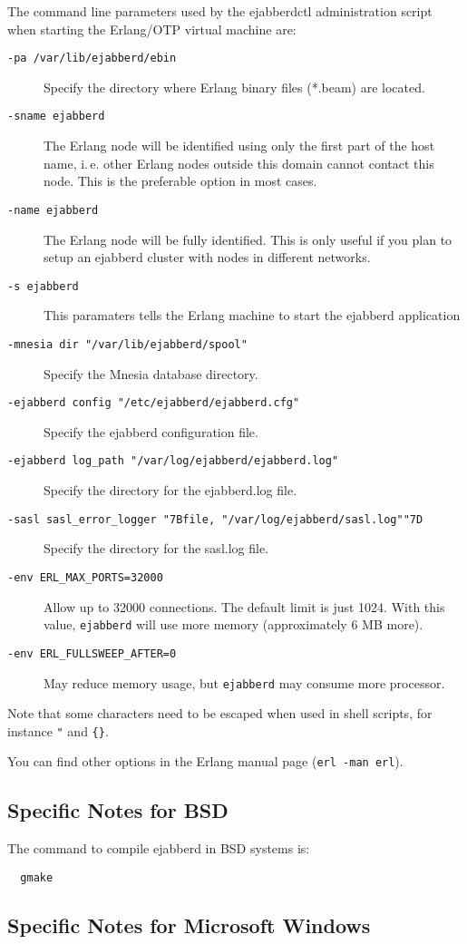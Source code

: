\documentclass[a4paper,10pt]{book}
\newcommand{\ind}[1]{\begin{latexonly}\index{#1}\end{latexonly}}
\newcommand{\bracehack}{\def\{{\char"7B}\def\}{\char"7D}}
\newcommand{\titem}[1]{\item[\bracehack\texttt{#1}]}
\newcommand{\shell}[1]{\texttt{#1}}
\newcommand{\ejabberd}{\texttt{ejabberd}}
\begin{document}
The command line parameters used by the ejabberdctl administration script 
when starting the Erlang/OTP virtual machine are:
\begin{description}
  \titem{-pa /var/lib/ejabberd/ebin} 
	Specify the directory where Erlang binary files (*.beam) are located.
  \titem{-sname ejabberd} 
	The Erlang node will be identified using only the first part
	of the host name, i.\,e. other Erlang nodes outside this domain cannot contact
	this node. This is the preferable option in most cases.
  \titem{-name ejabberd} 
	The Erlang node will be fully identified.
    This is only useful if you plan to setup an ejabberd cluster with nodes in different networks.
  \titem{-s ejabberd} 
	This paramaters tells the Erlang machine to start the ejabberd application
  \titem{-mnesia dir "/var/lib/ejabberd/spool"}
	Specify the Mnesia database directory.
  \titem{-ejabberd config "/etc/ejabberd/ejabberd.cfg"} 
	Specify the ejabberd configuration file.
  \titem{-ejabberd log\_path "/var/log/ejabberd/ejabberd.log"} 
	Specify the directory for the ejabberd.log file.
  \titem{-sasl sasl\_error\_logger \{file, "/var/log/ejabberd/sasl.log"\}}
	Specify the directory for the sasl.log file.
  \titem{-env ERL\_MAX\_PORTS=32000}
	Allow up to 32000 connections. The default limit is just 1024.
	With this value, \ejabberd{} will use more memory (approximately 6 MB more).
  \titem{-env ERL\_FULLSWEEP\_AFTER=0}
	May reduce memory usage, but \ejabberd{} may consume more processor.
\end{description}

Note that some characters need to be escaped when used in shell scripts, for instance \verb|"| and \verb|{}|.

You can find other options in the Erlang manual page (\shell{erl -man erl}).


\subsection{Specific Notes for BSD}
\label{bsd}
\ind{install!bsd}

The command to compile ejabberd in BSD systems is:
\begin{verbatim}
  gmake
\end{verbatim}


\subsection{Specific Notes for Microsoft Windows}
\label{windows}
\ind{install!windows}
\end{document}
